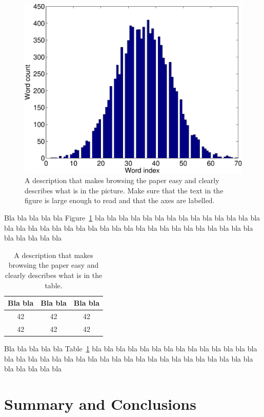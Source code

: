 \documentclass[a4paper,12pt]{article}
\begin{document}
\begin{figure}
\centering
\includegraphics[width=0.8\linewidth]{histogram}
\caption{A description that makes browsing the paper easy and clearly 
describes what is in the picture. Make sure that the text in the figure 
is large enough to read and that the axes are labelled.}
\label{fig:histogram}
\end{figure}

Bla bla bla bla bla Figure~\ref{fig:histogram} bla bla bla bla bla bla 
bla bla bla bla bla bla bla bla bla bla bla bla bla bla bla bla bla 
bla bla bla bla bla bla bla bla bla bla bla bla bla bla bla bla bla 

\begin{table}
\begin{center}
\begin{tabular}{|c|c|c|}
\hline
Bla bla & Bla bla & Bla bla \\ \hline
42 & 42 & 42 \\ \hline
42 & 42 & 42 \\ \hline
\end{tabular}
\caption{A description that makes browsing the paper easy and clearly 
describes what is in the table.}
\label{tab:results}
\end{center}
\end{table}

Bla bla bla bla bla Table~\ref{tab:results} bla bla bla bla bla bla 
bla bla bla bla bla bla bla bla bla bla bla bla bla bla bla bla bla 
bla bla bla bla bla bla bla bla bla bla bla bla bla bla bla bla bla 

\section{Summary and Conclusions}
\label{sec:summary}
\end{document}
